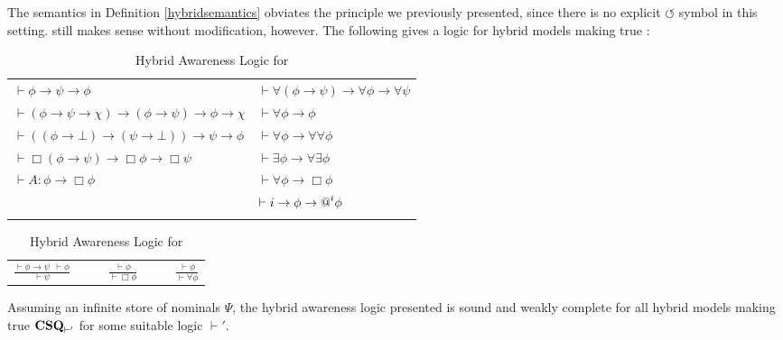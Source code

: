 The semantics in Definition \ref{hybridsemantics} obviates the 
principle we previously presented, since there is no explicit
$\circlearrowleft$ symbol in this setting.  still makes sense
without modification, however.  The following gives a logic for hybrid models
making true :
\begin{table}[h]
\centering
  \begin{tabular}{ll}
    $\vdash \phi \rightarrow \psi \rightarrow \phi$ & $\vdash \forall (\phi
    \rightarrow \psi) \rightarrow \forall \phi \rightarrow \forall \psi$\\
    $\vdash (\phi \rightarrow \psi \rightarrow \chi) \rightarrow (\phi
    \rightarrow \psi) \rightarrow \phi \rightarrow \chi$ & $\vdash \forall
    \phi \rightarrow \phi$\\
    $\vdash ((\phi \rightarrow \bot) \rightarrow (\psi \rightarrow \bot))
    \rightarrow \psi \rightarrow \phi$ & $\vdash \forall \phi \rightarrow
    \forall \forall \phi$\\
    $\vdash \Box(\phi \rightarrow \psi) \rightarrow \Box \phi \rightarrow \Box
    \psi$ & $\vdash \exists \phi \rightarrow \forall \exists \phi$\\
    $\vdash A : \phi \rightarrow \Box \phi$ & $\vdash \forall \phi \rightarrow
    \Box \phi$\\
    & $\vdash i \rightarrow \phi \rightarrow \text{{\upshape{@}}}^i \phi$\\
    &  
  \end{tabular}

\begin{tabular}{lllll}
      $\displaystyle\frac{\vdash \phi \rightarrow \psi \ \ \vdash \phi}{\vdash
      \psi}$ & \ \  & $\displaystyle \frac{\vdash \phi}{\vdash \Box \phi}$ &
      \ \  & $\displaystyle \frac{\vdash \phi}{\vdash \forall \phi}$
    \end{tabular}
  \caption{\label{logic2}Hybrid Awareness Logic for }
\end{table}

\begin{theorem}
  \label{completeness2}Assuming an infinite store of nominals $\Psi$, the
  hybrid awareness logic presented is sound and weakly complete for all hybrid
  models making true $\textup{{\bfseries{CSQ}}}_{\vdash'}$ for some
  suitable logic $\vdash'$.
\end{theorem}



